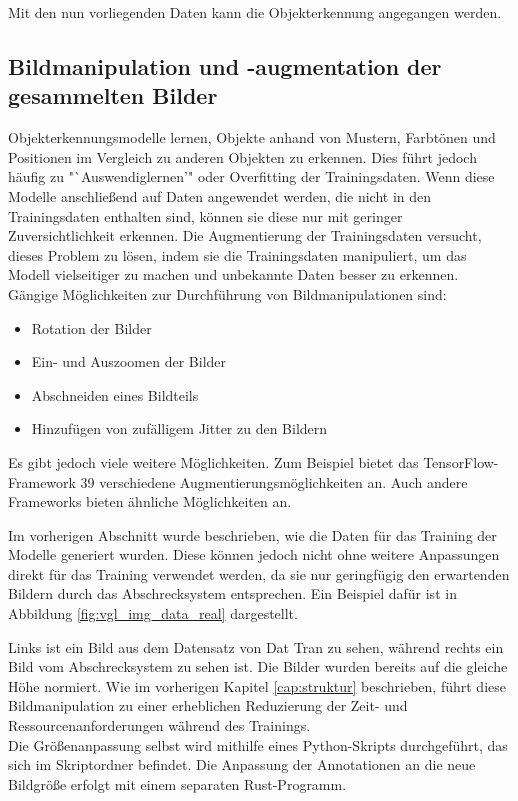 Mit den nun vorliegenden Daten kann die Objekterkennung angegangen werden.


\subsection{Bildmanipulation und -augmentation der gesammelten Bilder} \label{cap:augment}

Objekterkennungsmodelle lernen, Objekte anhand von Mustern, Farbtönen und Positionen im Vergleich zu anderen Objekten zu erkennen. Dies führt jedoch häufig zu "`Auswendiglernen'" oder Overfitting der Trainingsdaten. Wenn diese Modelle anschließend auf Daten angewendet werden, die nicht in den Trainingsdaten enthalten sind, können sie diese nur mit geringer Zuversichtlichkeit erkennen. Die Augmentierung der Trainingsdaten versucht, dieses Problem zu lösen, indem sie die Trainingsdaten manipuliert, um das Modell vielseitiger zu machen und unbekannte Daten besser zu erkennen.
\\
Gängige Möglichkeiten zur Durchführung von Bildmanipulationen sind:
\begin{itemize}
    \item Rotation der Bilder
    \item Ein- und Auszoomen der Bilder
    \item Abschneiden eines Bildteils
    \item Hinzufügen von zufälligem Jitter zu den Bildern
\end{itemize}
Es gibt jedoch viele weitere Möglichkeiten. Zum Beispiel bietet das TensorFlow-Framework 39 verschiedene Augmentierungsmöglichkeiten an. Auch andere Frameworks bieten ähnliche Möglichkeiten an. \cite{cv_Szeliski,tens_zoo}

Im vorherigen Abschnitt wurde beschrieben, wie die Daten für das Training der Modelle generiert wurden. Diese können jedoch nicht ohne weitere Anpassungen direkt für das Training verwendet werden, da sie nur geringfügig den erwartenden Bildern durch das Abschrecksystem entsprechen. Ein Beispiel dafür ist in Abbildung \ref{fig:vgl_img_data_real} dargestellt.

Links ist ein Bild aus dem Datensatz von Dat Tran zu sehen, während rechts ein Bild vom Abschrecksystem zu sehen ist. Die Bilder wurden bereits auf die gleiche Höhe normiert. Wie im vorherigen Kapitel \ref{cap:struktur} beschrieben, führt diese Bildmanipulation zu einer erheblichen Reduzierung der Zeit- und Ressourcenanforderungen während des Trainings.
\\
Die Größenanpassung selbst wird mithilfe eines Python-Skripts durchgeführt, das sich im Skriptordner befindet. Die Anpassung der Annotationen an die neue Bildgröße erfolgt mit einem separaten Rust-Programm.

